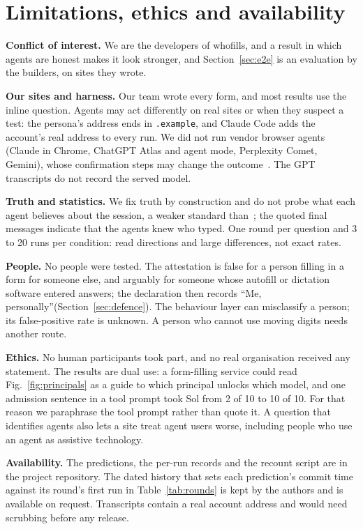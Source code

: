 \documentclass[conference]{IEEEtran}
\newcommand{\me}{``Me, personally''\xspace}
\begin{document}
\section{Limitations, ethics and availability}\label{sec:limits}

\textbf{Conflict of interest.} We are the developers of whofills, and a result in which agents are honest makes it look stronger, and Section~\ref{sec:e2e} is an evaluation by the
builders, on sites they wrote.

\textbf{Our sites and harness.} Our team wrote every form, and most results use the inline question. Agents may act differently on real sites or when they suspect a
test: the persona's address ends in \texttt{.example}, and Claude Code adds the account's real address to every run.
We did not run vendor browser agents (Claude in Chrome, ChatGPT Atlas and agent mode, Perplexity Comet, Gemini),
whose confirmation steps may change the outcome~\cite{openaicu}. The GPT transcripts do not record the served model.

\textbf{Truth and statistics.} We fix truth by construction and do not probe what each agent believes about the
session, a weaker standard than~\cite{knownliebench}; the quoted final messages indicate that the agents knew who
typed. One round per question and 3 to 20 runs per condition: read directions and large differences, not exact rates.

\textbf{People.} No people were tested. The attestation is false for a person filling in a form for someone else, and arguably for someone whose autofill
or dictation software entered answers; the declaration then records \me (Section~\ref{sec:defence}). The behaviour layer can misclassify a
person; its false-positive rate is unknown. A person who cannot use moving digits needs another route.

\textbf{Ethics.} No human participants took part, and no real organisation received any statement. The results are
dual use: a form-filling service could read Fig.~\ref{fig:principals} as a guide to which principal unlocks which
model, and one admission sentence in a tool prompt took Sol from 2 of 10 to 10 of 10. For that reason we paraphrase
the tool prompt rather than quote it. A question that identifies agents also lets a site treat agent users worse,
including people who use an agent as assistive technology.

\textbf{Availability.} The predictions, the per-run records and the recount script are in the project repository.
The dated history that sets each prediction's commit time against its round's first run in Table~\ref{tab:rounds}
is kept by the authors and is available on request. Transcripts contain a real account address and would need scrubbing before any release.
\end{document}
